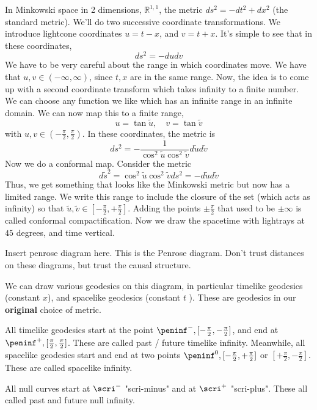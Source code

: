 In Minkowski space in 2 dimensions, $ \mathbb{ R} ^{ 1, 1 } $, 
the metric $ ds ^ 2 = - d t ^ 2 + dx ^ 2 $ (the standard metric). 
We'll do two successive coordinate transformations. 
We introduce lightcone coordinates  $ u  = t  -x $, 
and $ v = t + x $. It's simple to see that 
in these coordinates, 
\[
 ds ^ 2 =  - du dv
\] We have to be very careful about the range in which coordinates move. 
We have that $ u , v \in ( - \infty  , \infty ) $, 
since $ t , x  $  are in the same range. 
Now, the idea is to come up with a second coordinate transform which 
takes infinity to a finite number. We can choose any function we 
like which has an infinite range in an infinite domain. 
We can now map this to a finite range, 
\[
 u = \tan \tilde{ u } , \quad v = \tan \tilde{ v }   
\] with $ u , v  \in ( - \frac{ \pi }{ 2 } , \frac{\pi}{ 2 } ) $. 
In these coordinates, the metric is 
\[
 ds ^  2 =  -\frac{1}{\cos ^ 2 \tilde{ u } \cos ^ 2 \tilde{ v}   } d \tilde{ u } d \tilde{ v }   
\] Now we do a conformal map. 
Consider the metric 
\[
 d \tilde{ s } ^ 2 = \cos ^ 2 \tilde{ u } \cos ^ 2 \tilde{v } ds ^ 2  = - d \tilde{ u } d \tilde{ v }      
\] Thus, 
we get something that looks like 
the Minkowski metric but now has a limited range. 
We write this range to include the closure of the set (which acts as infinity) 
so that $ \tilde{ u } , \tilde{ v } \in [ - \frac{\pi}{2 } , + \frac{\pi}{2 } ]   $. 
Adding the points $ \pm \frac{\pi}{ 2 } $ that used to be 
$ \pm \infty$ is called conformal compactification.
Now we draw the spacetime with 
lightrays at $ 45 $ degrees, and time vertical.

Insert penrose diagram here. 
This is the Penrose diagram. Don't
trust distances on these diagrams, but trust the causal structure. 

We can draw various geodesics on this diagram, 
in particular timelike geodesics (constant $ x $), 
and spacelike geodesics (constant $  t$ ). 
These are geodesics in our \textbf{original } choice 
of metric.

All timelike geodesics start at the point $ \peninf ^ -  , [ - \frac{\pi}{2 } , - \frac{\pi}{2  }] $, 
and end at $ \peninf ^ + , [ \frac{\pi}{2 } , \frac{\pi}{ 2   }]$. These are
called past / future timelike infinity. 
Meanwhile, all spacelike geodesics 
start and end at two points $ \peninf ^ 0  , [ - \frac{\pi}{2 }, + \frac{\pi}{2 } ] $ or 
$ [ + \frac{\pi}{2 } , - \frac{\pi}{ 2 } ] $. These are called spacelike 
infinity. 

All null curves start at $ \scri ^ - $ "scri-minus" and at $ \scri ^ + $ "scri-plus". 
These all called past and future null infinity.

